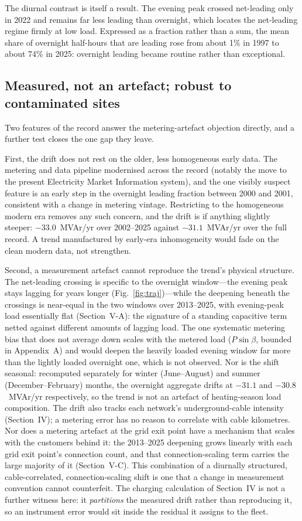 \documentclass[journal]{IEEEtran}
\begin{document}
The diurnal contrast is itself a result. The evening peak crossed net-leading only
in 2022 and remains far less leading than overnight, which locates the net-leading
regime firmly at low load. Expressed as a
fraction rather than a sum, the mean share of overnight half-hours that are leading
rose from about 1\% in 1997 to about 74\% in 2025: overnight leading became routine
rather than exceptional.

\subsection{Measured, not an artefact; robust to contaminated sites}
Two features of the record answer the metering-artefact objection
directly, and a further test closes the one gap they leave.

First, the drift does not rest on the older, less homogeneous early data. The metering
and data pipeline modernised across the record (notably the move to the present
Electricity Market Information system), and the one visibly suspect feature is an early
step in the overnight leading fraction between 2000 and 2001, consistent with a change
in metering vintage. Restricting to the homogeneous modern era removes any such concern,
and the drift is if anything slightly steeper: $-33.0$~MVAr/yr over 2002--2025 against
$-31.1$~MVAr/yr over the full record. A trend manufactured by early-era inhomogeneity
would fade on the clean modern data, not strengthen.

Second, a measurement artefact cannot reproduce the trend's physical structure. The
net-leading crossing is specific to the overnight window---the evening peak stays
lagging for years longer (Fig.~\ref{fig:traj})---while the deepening beneath the
crossings is near-equal in the two windows over 2013--2025, with evening-peak load
essentially flat (Section~V-A): the signature of a standing capacitive term netted
against different amounts of lagging load. The one systematic metering bias that does
not average down scales with the metered load ($P\sin\beta$, bounded in Appendix~A)
and would deepen the heavily loaded evening window far more than the lightly loaded
overnight one, which is not observed. Nor is the shift seasonal: recomputed
separately for winter (June--August) and summer (December--February) months, the
overnight aggregate drifts at $-31.1$ and $-30.8$~MVAr/yr respectively, so the trend
is not an artefact of heating-season load composition. The drift also tracks each network's
underground-cable intensity (Section~IV); a metering error has no reason to
correlate with cable kilometres. Nor does a metering artefact at the grid
exit point have a mechanism that scales with the customers behind it: the 2013--2025 deepening grows
linearly with each grid exit point's connection count, and that
connection-scaling term carries the large majority of it (Section~V-C). This
combination of a diurnally structured, cable-correlated, connection-scaling
shift is one that a change in measurement convention cannot counterfeit. The
charging calculation of Section~IV is not a further witness here: it
\emph{partitions} the measured drift rather than reproducing it, so an
instrument error would sit inside the residual it assigns to the fleet.
\end{document}
